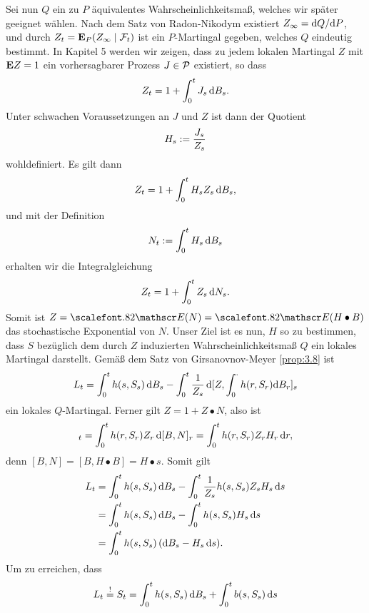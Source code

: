 \begin{ex}
Sei nun $Q$ ein zu $P$ äquivalentes Wahrscheinlichkeitsmaß, welches wir später
geeignet wählen. Nach dem Satz von Radon-Nikodym existiert
$Z_\infty = \mathrm{d} Q/\mathrm{d} P$, und durch $Z_t = \mathbf{E}_P(Z_\infty\mid\mathcal{F}_t)$ ist ein
$P$-Martingal gegeben, welches $Q$ eindeutig bestimmt.
 In Kapitel 5 werden wir zeigen, dass zu
jedem lokalen Martingal $Z$ mit $\mathbf{E} Z = 1$ ein vorhersagbarer Prozess $J\in\mathcal{P}$
existiert, so dass
\begin{align*}
Z_t = 1 + \int_0^t J_s\,\mathrm{d} B_s.
\end{align*}
Unter schwachen Voraussetzungen an $J$ und $Z$ ist dann der Quotient 
\begin{align*}
H_s := \frac{J_s}{Z_s}
\end{align*}
wohldefiniert. Es gilt dann
\begin{align*}
Z_t = 1 + \int_0^t H_s Z_s\,\mathrm{d} B_s,
\end{align*}
und mit der Definition
\begin{align*}
N_t := \int_0^t H_s\,\mathrm{d} B_s
\end{align*}
erhalten wir die Integralgleichung
\begin{align*}
Z_t = 1 + \int_0^t Z_s\,\mathrm{d} N_s.
\end{align*}
Somit ist $Z = \Ep(N) = \Ep(H\bullet B)$ das stochastische Exponential von $N$.
Unser Ziel ist es nun, $H$ so zu bestimmen, dass $S$ bezüglich dem durch $Z$
induzierten Wahrscheinlichkeitsmaß $Q$ ein lokales Martingal darstellt. 
Gemäß dem Satz von Girsanovnov-Meyer \ref{prop:3.8} ist
\begin{align*}
L_t = \int_0^t h(s,S_s)\, \mathrm{d} B_s - \int_0^t \frac{1}{Z_s}
\,\mathrm{d}[Z,\int_0^\cdot h(r,S_r)\mathrm{d} B_r]_s
\end{align*}
ein lokales $Q$-Martingal. Ferner gilt $Z=1 + Z\bullet N$, also ist
\begin{align*}
[Z,\int_0^\cdot
h(r,S_r)\,\dB_r]_t = 
\int_0^t h(r,S_r)Z_r \,\diffd [B,N]_r
=
\int_0^t h(r,S_r)Z_rH_r \,\dr,
\end{align*}
denn $[B,N] = [B,H\bullet B] = H\bullet s$. Somit gilt
\begin{align*}
L_t &= \int_0^t h(s,S_s)\, \mathrm{d} B_s - \int_0^t \frac{1}{Z_s}h(s,S_s)Z_s H_s\,\mathrm{d} s\\
&= \int_0^t h(s,S_s)\, \mathrm{d} B_s - \int_0^t h(s,S_s) H_s\,\mathrm{d} s\\
&= \int_0^t h(s,S_s)\, (\mathrm{d} B_s - H_s\,\mathrm{d} s).
\end{align*}
Um zu erreichen, dass
\begin{align*}
L_t \overset{!}{=} S_t &= \int_0^t h(s,S_s)\,\dB_s + \int_0^t b(s,S_s)\,\ds\\

\end{align*}
\end{ex}
